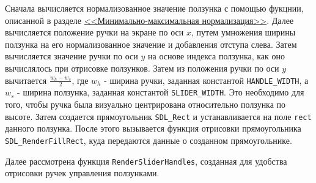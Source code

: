 \documentclass[14pt]{extarticle}
\begin{document}
{    \begin{center}
    \end{center}
    \vspace{-0.5em}

    \begin{spacing}{1.5}
        Сначала вычисляется нормализованное значение ползунка с помощью фукцнии, описанной в разделе \hyperref[sec:minmaxnorm]{<<Минимально-максимальная нормализация>>}. Далее вычисляется положение ручки на экране по оси $x$, путем умножения ширины ползунка на его нормализованное значение и добавления отступа слева. Затем вычисляется значение ручки по оси $y$ на основе индекса ползунка, как оно вычислялось при отрисовке ползунков. Затем из положения ручки по оси $y$ вычитается $\frac{w_h - w_s}{2}$, где $w_h$ - ширина ручки, заданная константой \verb|HANDLE_WIDTH|, а $w_s$ - ширина ползунка, заданная константой \verb|SLIDER_WIDTH|. Это необходимо для того, чтобы ручка была визуально центрирована относительно ползунка по высоте. Затем создается прямоугольник \verb|SDL_Rect| и устанавливается на поле \verb|rect| данного ползунка. После этого вызывается функция отрисовки прямоугольника \verb|SDL_RenderFillRect|, куда передаются данные о созданном прямоугольнике.
        \par
        Далее рассмотрена функция \verb|RenderSliderHandles|, созданная для удобства отрисовки ручек управления ползунками.
    \end{spacing}

}
\end{document}
